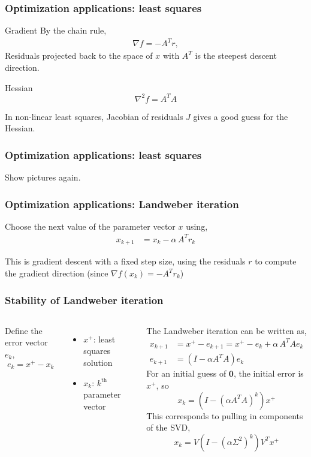 \documentclass[xcolor={dvipsnames}]{beamer}
\begin{document}
\begin{frame}
\frametitle{Optimization applications: least squares}
\begin{exampleblock}{Gradient}
By the chain rule,
\begin{align*}
 \nabla f = - A^T r,
\end{align*}
Residuals projected back to the space of $x$ with $A^T$ is the steepest descent direction.
\end{exampleblock}
\begin{exampleblock}{Hessian}
$$\nabla^2 f = A^T A $$

In non-linear least squares, Jacobian of residuals $J$ gives a good guess for the Hessian.
\end{exampleblock}
\end{frame}

\begin{frame}
\frametitle{Optimization applications: least squares}
Show pictures again.
\end{frame}

\begin{frame}
\frametitle{Optimization applications: Landweber iteration}
Choose the next value of the parameter vector $x$ using,
\begin{align*}
x_{k+1}& = x_k - \alpha \, A^T r_k 
\end{align*}
\begin{block}{}
This is gradient descent with a fixed step size, using the residuals $r$ to compute the gradient direction (since $\nabla f(x_k) = - A^T r_k$)
\end{block}
\end{frame}

\begin{frame}
\frametitle{Stability of Landweber iteration}
\begin{columns}
Define the error vector $e_k$,
$$e_k = x^+ - x_k$$
\begin{itemize}
    \item $x^+$: least squares solution 
    \item $x_k$:  $k^\text{th}$ parameter vector
\end{itemize}
The Landweber iteration can be written as,
\begin{align*}
x_{k+1}& = x^+ - e_{k+1} = x^+ - e_k + \alpha \, A^T A e_k \\
e_{k+1}& = (I - \alpha A^T A) e_k
\end{align*}
For an initial guess of $\mathbf{0}$, the initial error is $x^+$, so
$$ x_{k} = (I - (\alpha A^T A)^k) x^+ $$
This corresponds to pulling in components of the SVD,
$$  x_{k} = V (I - (\alpha \Sigma^2)^k) V^T x^+  $$
\end{columns}
\end{frame}
\end{document}
